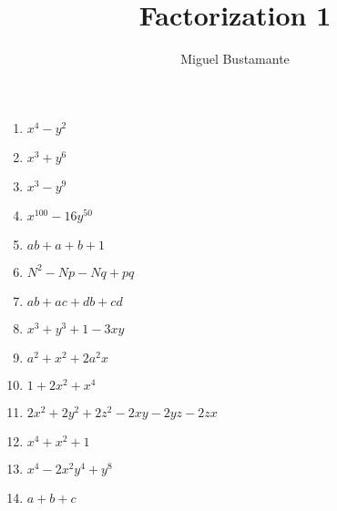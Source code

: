 \documentclass{article}
\title{Factorization 1}
\author{Miguel Bustamante}
\begin{document}
\maketitle
\begin{multicols}{3}
\begin{enumerate}
    \item $x^4-y^2$
    \item $x^3+y^6$
    \item $x^3-y^9$
    \item $x^{100}-16y^{50}$
    \item $ab+a+b+1$
    \item $N^2-Np-Nq+pq$
    \item $ab+ac+db+cd$
    \item $x^3+y^3+1-3xy$
    \item $a^2+x^2+2a^2x$
    \item $1+2x^2+x^4$
    \item $2x^2+2y^2+2z^2-2xy-2yz-2zx$
    \item $x^4+x^2+1$
    \item $x^4-2x^2y^4+y^8$
    \item $a+b+c$
\end{enumerate}
\end{multicols}
\end{document}

